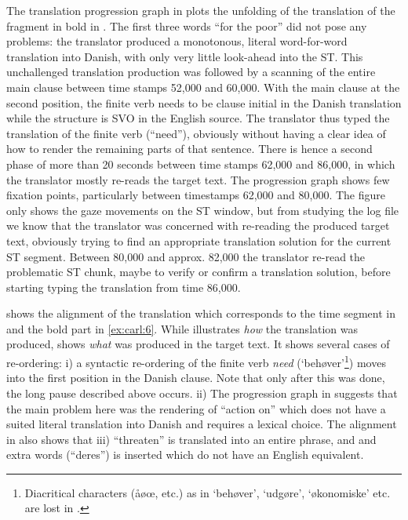 \documentclass[output=paper]{LSP/langsci}
\begin{document}
The translation progression graph in  plots the unfolding of the translation of the fragment in bold in . The first three words ``for the poor'' did not pose any problems: the translator produced a monotonous, literal word-for-word translation into Danish, with only very little look-ahead into the ST. This unchallenged translation production was followed by a scanning of the entire main clause between time stamps 52,000 and 60,000. With the main clause at the second position, the finite verb needs to be clause initial in the Danish translation while the structure is SVO in the English source. The translator thus typed the translation of the finite verb (``need''), obviously without having a clear idea of how to render the remaining parts of that sentence.  There is hence a second phase of more than 20 seconds between time stamps 62,000 and 86,000, in which the translator mostly re-reads the target text. The progression graph shows few fixation points, particularly between timestamps 62,000 and 80,000. The figure only shows the gaze movements on the ST window, but from studying the log file we know that the translator was concerned with re-reading the produced target text, obviously trying to find an appropriate translation solution for the current ST segment. Between 80,000 and approx. 82,000 the translator re-read the problematic ST chunk, maybe to verify or confirm a translation solution, before starting typing the translation from time 86,000. 

 shows the alignment of the translation which corresponds to the time segment in  and the bold part in \ref{ex:carl:6}. While  illustrates \textit{how} the translation was produced,  shows \textit{what} was produced in the target text. It shows several cases of re-ordering: i) a syntactic re-ordering of the finite verb \textit{need} (`behøver'\footnote{Diacritical characters (åøœ, etc.) as in `behøver', `udgøre', `økonomiske' etc. are lost in .}) moves into the first position in the Danish clause. Note that only after this was done, the long pause described above occurs. ii) The progression graph in  suggests that the main problem here was the rendering of ``action on'' which does not have a suited literal translation into Danish and requires a lexical choice. The alignment in  also shows that iii) ``threaten'' is translated into an entire phrase, and and extra words (``deres'') is inserted which do not have an English equivalent.
\end{document}
